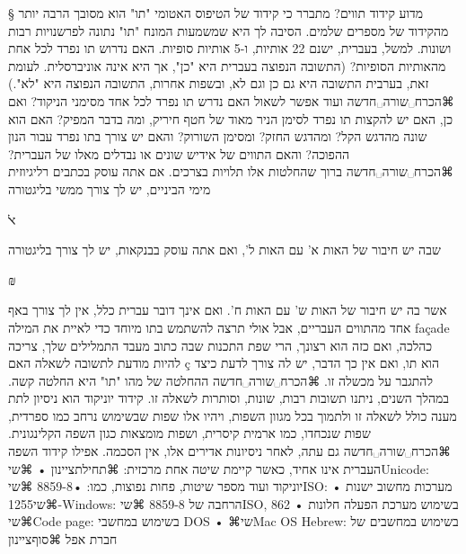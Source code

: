 § מדוע קידוד תווים?
מתברר כי קידוד של הטיפוס האטומי "תו" הוא מסובך הרבה יותר מהקידוד של מספרים שלמים. הסיבה לך היא שמשמעות המונח "תו" נתונה לפרשנויות רבות ושונות. למשל, בעברית, ישנם 22 אותיות, ו-5 אותיות סופיות. האם נדרוש תו נפרד לכל אחת מהאותיות הסופיות? (התשובה הנפוצה בעברית היא "כן", אך היא אינה אוניברסלית. לעומת זאת, בערבית התשובה היא גם כן וגם לא, ובשפות אחרות, התשובה הנפוצה היא "לא".)
⌘הכרח␣שורה␣חדשה
ועוד אפשר לשאול האם נדרש תו נפרד לכל אחד מסימני הניקוד? ואם כן, האם יש להקצות תו נפרד לסימן הניר מאוד של חטף חיריק, ומה בדבר המפיק? האם הוא שונה מהדגש הקל? ומהדגש החזק? ומסימן השורוק? והאם יש צורך בתו נפרד עבור הנון ההפוכה? והאם התווים של אידיש שונים או נבדלים מאלו של העברית?
⌘הכרח␣שורה␣חדשה
ברוך שהחלטות אלו תלויות בצרכים. אם אתה עוסק בכתבים רליגיוזית מימי הביניים, יש לך צורך ממשי בליגטורה
\begin{center}
\Huge{ﭏ}
\normalsize{}
\end{center}
שבה יש חיבור של האות א' עם האות ל', ואם אתה עוסק בבנקאות, יש לך צורך בליגטורה
\begin{center}
\Huge{₪}
\normalsize{}
\end{center}
אשר בה יש חיבור של האות ש' עם האות ח'. ואם אינך דובר עברית כלל, אין לך צורך באף אחד מהתווים העבריים, אבל אולי תרצה להשתמש בתו מיוחד כדי לאיית את המילה façade כהלכה, ואם כזה הוא רצונך, הרי שפת התכנות שבה כתוב מעבד התמלילים שלך, צריכה להיות מודעת לתשובה לשאלה האם ç הוא תו, ואם אין כך הדבר, יש לה צורך לדעת כיצד להתגבר על מכשלה זו.
⌘הכרח␣שורה␣חדשה
ההחלטה של מהו "תו" היא החלטה קשה. במהלך השנים, ניתנו תשובות רבות, שונות, וסותרות לשאלה זו. קידוד יוניקוד הוא ניסיון לתת מענה כולל לשאלה זו ולתמוך בכל מגוון השפות, ויהיו אלו שפות שבשימוש נרחב כמו ספרדית, שפות שנכחדו, כמו ארמית קיסרית, ושפות מומצאות כגון השפה הקלינגונית.
⌘הכרח␣שורה␣חדשה
גם עתה, לאחר ניסיונות אדירים אלו, אין הסכמה. אפילו קידוד השפה העברית אינו אחיד, כאשר קיימת שיטה אחת מרכזית:
⌘תחילת{ציינון}
• ⌘שי{Unicode}: יוניקוד
ועוד מספר שיטות, פחות נפוצות, כמו:
•8859-8  ⌘שי{ISO}: מערכות מחשוב ישנות
• ⌘שי{1255-Windows}: הרחבה של 8859-8  ⌘שי{ISO}, בשימוש מערכת הפעלה חלונות
• 862 ⌘שי{Code page}: בשימוש במחשבי DOS
• ⌘שי{Mac OS Hebrew}: בשימוש במחשבים של חברת אפל
⌘סוף{ציינון}

